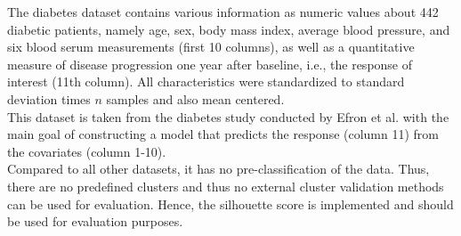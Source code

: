 The diabetes dataset contains various information as numeric values about 442 diabetic patients, namely age, sex, body mass index, average blood pressure, and six blood serum measurements (first 10 columns), as well as a quantitative measure of disease progression one year after baseline, i.e., the response of interest (11th column). All characteristics were standardized to standard deviation times $n$ samples and also mean centered.\\
This dataset is taken from the diabetes study conducted by Efron et al. \cite{diabetes} with the main goal of constructing a model that predicts the response (column 11) from the covariates (column 1-10).\\
Compared to all other datasets, it has no pre-classification of the data. Thus, there are no predefined clusters and thus no external cluster validation methods can be used for evaluation. Hence, the silhouette score is implemented and should be used for evaluation purposes.

